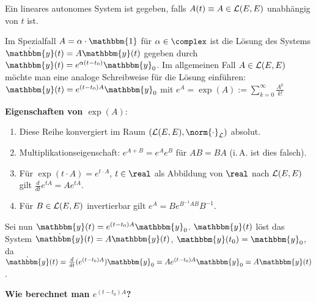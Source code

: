 Ein lineares autonomes System ist gegeben, falls $A(t) \equiv A \in \mathcal{L}(E, E)$
unabhängig von $t$ ist.

Im Spezialfall $A = \alpha \cdot \mathbbm{1}$ für $\alpha \in \complex$ ist
die Lösung des Systems $\dot{\mathbbm{y}}(t) = A \mathbbm{y}(t)$ gegeben durch
$\mathbbm{y}(t) = e^{\alpha (t - t_0)} \mathbbm{y}_0$.
Im allgemeinen Fall $A \in \mathcal{L}(E, E)$ möchte man eine analoge Schreibweise
für die Lösung einführen:
$\mathbbm{y}(t) = e^{(t - t_0) A} \mathbbm{y}_0$ mit
$e^A = \exp(A) := \sum_{k=0}^\infty \frac{A^k}{k!}$

\textbf{Eigenschaften von $\exp(A)$}:
\begin{enumerate}
    \item
    Diese Reihe konvergiert im Raum $(\L(E, E), \norm{\cdot}_\L)$ absolut.

    \item
    Multiplikationseigenschaft:
    $e^{A + B} = e^A e^B$ für $AB = BA$ (i.\,A. ist dies falsch).

    \item
    Für $\exp(t \cdot A) = e^{t \cdot A}$, $t \in \real$ als
    Abbildung von $\real$ nach $\mathcal{L}(E, E)$ gilt
    $\frac{d}{dt} e^{tA} = A e^{tA}$.

    \item
    Für $B \in \mathcal{L}(E, E)$ invertierbar gilt
    $e^A = B e^{B^{-1}AB} B^{-1}$.
\end{enumerate}

Sei nun $\mathbbm{y}(t) = e^{(t - t_0) A} \mathbbm{y}_0$.
$\mathbbm{y}(t)$ löst das System $\dot{\mathbbm{y}}(t) = A \mathbbm{y}(t)$,
$\mathbbm{y}(t_0) = \mathbbm{y}_0$, da \\
$\dot{\mathbbm{y}}(t) = \frac{d}{dt} (e^{(t - t_0) A}) \mathbbm{y}_0 =
A e^{(t - t_0) A} \mathbbm{y}_0 = A \mathbbm{y}(t)$.

\linie

\textbf{Wie berechnet man $e^{(t - t_0) A}$?}

